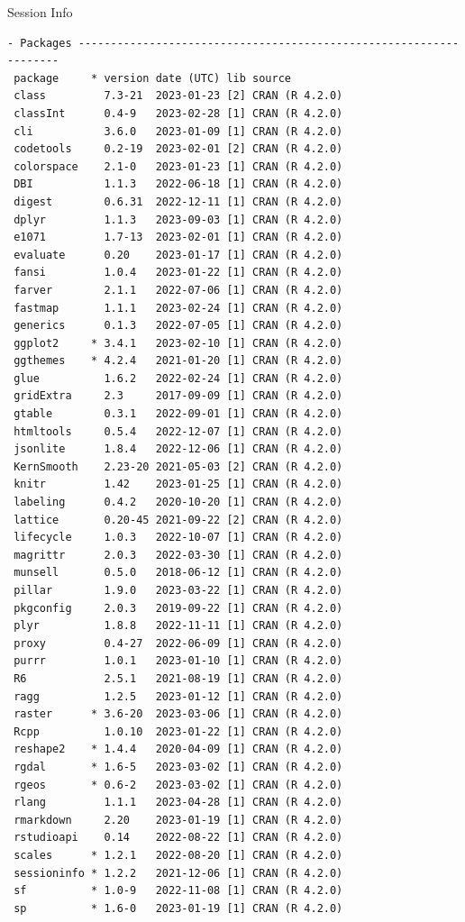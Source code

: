 \documentclass[
  ignorenonframetext,
  aspectratio=169,
]{beamer}
\begin{document}
\begin{frame}[fragile]{Session Info}
\begin{verbatim}
- Packages -------------------------------------------------------------------
 package     * version date (UTC) lib source
 class         7.3-21  2023-01-23 [2] CRAN (R 4.2.0)
 classInt      0.4-9   2023-02-28 [1] CRAN (R 4.2.0)
 cli           3.6.0   2023-01-09 [1] CRAN (R 4.2.0)
 codetools     0.2-19  2023-02-01 [2] CRAN (R 4.2.0)
 colorspace    2.1-0   2023-01-23 [1] CRAN (R 4.2.0)
 DBI           1.1.3   2022-06-18 [1] CRAN (R 4.2.0)
 digest        0.6.31  2022-12-11 [1] CRAN (R 4.2.0)
 dplyr         1.1.3   2023-09-03 [1] CRAN (R 4.2.0)
 e1071         1.7-13  2023-02-01 [1] CRAN (R 4.2.0)
 evaluate      0.20    2023-01-17 [1] CRAN (R 4.2.0)
 fansi         1.0.4   2023-01-22 [1] CRAN (R 4.2.0)
 farver        2.1.1   2022-07-06 [1] CRAN (R 4.2.0)
 fastmap       1.1.1   2023-02-24 [1] CRAN (R 4.2.0)
 generics      0.1.3   2022-07-05 [1] CRAN (R 4.2.0)
 ggplot2     * 3.4.1   2023-02-10 [1] CRAN (R 4.2.0)
 ggthemes    * 4.2.4   2021-01-20 [1] CRAN (R 4.2.0)
 glue          1.6.2   2022-02-24 [1] CRAN (R 4.2.0)
 gridExtra     2.3     2017-09-09 [1] CRAN (R 4.2.0)
 gtable        0.3.1   2022-09-01 [1] CRAN (R 4.2.0)
 htmltools     0.5.4   2022-12-07 [1] CRAN (R 4.2.0)
 jsonlite      1.8.4   2022-12-06 [1] CRAN (R 4.2.0)
 KernSmooth    2.23-20 2021-05-03 [2] CRAN (R 4.2.0)
 knitr         1.42    2023-01-25 [1] CRAN (R 4.2.0)
 labeling      0.4.2   2020-10-20 [1] CRAN (R 4.2.0)
 lattice       0.20-45 2021-09-22 [2] CRAN (R 4.2.0)
 lifecycle     1.0.3   2022-10-07 [1] CRAN (R 4.2.0)
 magrittr      2.0.3   2022-03-30 [1] CRAN (R 4.2.0)
 munsell       0.5.0   2018-06-12 [1] CRAN (R 4.2.0)
 pillar        1.9.0   2023-03-22 [1] CRAN (R 4.2.0)
 pkgconfig     2.0.3   2019-09-22 [1] CRAN (R 4.2.0)
 plyr          1.8.8   2022-11-11 [1] CRAN (R 4.2.0)
 proxy         0.4-27  2022-06-09 [1] CRAN (R 4.2.0)
 purrr         1.0.1   2023-01-10 [1] CRAN (R 4.2.0)
 R6            2.5.1   2021-08-19 [1] CRAN (R 4.2.0)
 ragg          1.2.5   2023-01-12 [1] CRAN (R 4.2.0)
 raster      * 3.6-20  2023-03-06 [1] CRAN (R 4.2.0)
 Rcpp          1.0.10  2023-01-22 [1] CRAN (R 4.2.0)
 reshape2    * 1.4.4   2020-04-09 [1] CRAN (R 4.2.0)
 rgdal       * 1.6-5   2023-03-02 [1] CRAN (R 4.2.0)
 rgeos       * 0.6-2   2023-03-02 [1] CRAN (R 4.2.0)
 rlang         1.1.1   2023-04-28 [1] CRAN (R 4.2.0)
 rmarkdown     2.20    2023-01-19 [1] CRAN (R 4.2.0)
 rstudioapi    0.14    2022-08-22 [1] CRAN (R 4.2.0)
 scales      * 1.2.1   2022-08-20 [1] CRAN (R 4.2.0)
 sessioninfo * 1.2.2   2021-12-06 [1] CRAN (R 4.2.0)
 sf          * 1.0-9   2022-11-08 [1] CRAN (R 4.2.0)
 sp          * 1.6-0   2023-01-19 [1] CRAN (R 4.2.0)

\end{verbatim}
\end{frame}
\end{document}
